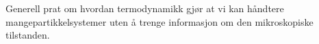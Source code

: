 \documentclass[a4paper,norsk,12pt]{article}
\begin{document}
Generell prat om hvordan termodynamikk gjør at vi kan håndtere mangepartikkelsystemer uten å trenge informasjon om den mikroskopiske tilstanden.





\appendix

\end{document}
